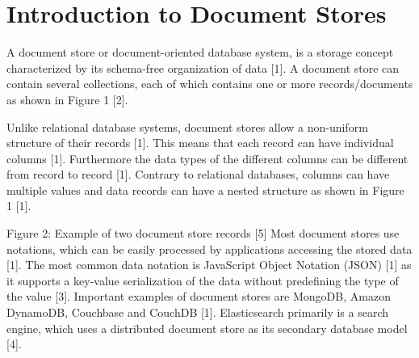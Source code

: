 \chapter{Introduction to Document Stores}

A document store or document-oriented database system, is a storage concept characterized by its schema-free organization of data [1]. 
A document store can contain several collections, each of which contains one or more records/documents as shown in Figure 1 [2].

Unlike relational database systems, document stores allow a non-uniform structure of their records [1]. This means that each record can have individual columns [1]. Furthermore the data types of the different columns can be different from record to record [1]. 
Contrary to relational databases, columns can have multiple values and data records can have a nested structure as shown in Figure 1 [1].

Figure 2: Example of two document store records [5]
Most document stores use notations, which can be easily processed by applications accessing the stored data [1]. The most common data notation is JavaScript Object Notation (JSON) [1] as it supports a key-value serialization of the data without predefining the type of the value [3].
Important examples of document stores are MongoDB, Amazon DynamoDB, Couchbase and CouchDB [1]. Elasticsearch primarily is a search engine, which uses a distributed document store as its secondary database model [4].

